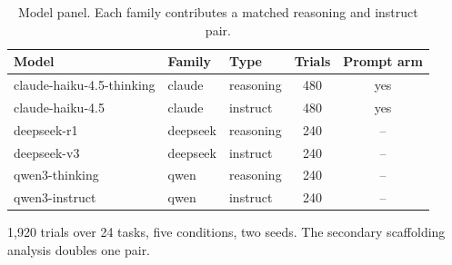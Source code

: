 \begin{table}[t]
\centering
\caption{Model panel. Each family contributes a matched reasoning and instruct pair.}
\label{tab:design}
\footnotesize
\setlength{\tabcolsep}{4pt}
\begin{tabular}{lllcc}
\hline
Model & Family & Type & Trials & Prompt arm \\
\hline
claude-haiku-4.5-thinking & claude & reasoning & 480 & yes \\
claude-haiku-4.5 & claude & instruct & 480 & yes \\
deepseek-r1 & deepseek & reasoning & 240 & -- \\
deepseek-v3 & deepseek & instruct & 240 & -- \\
qwen3-thinking & qwen & reasoning & 240 & -- \\
qwen3-instruct & qwen & instruct & 240 & -- \\
\hline
\end{tabular}
\par\smallskip\scriptsize 1{,}920 trials over 24 tasks, five conditions, two seeds. The secondary scaffolding analysis doubles one pair.
\end{table}

